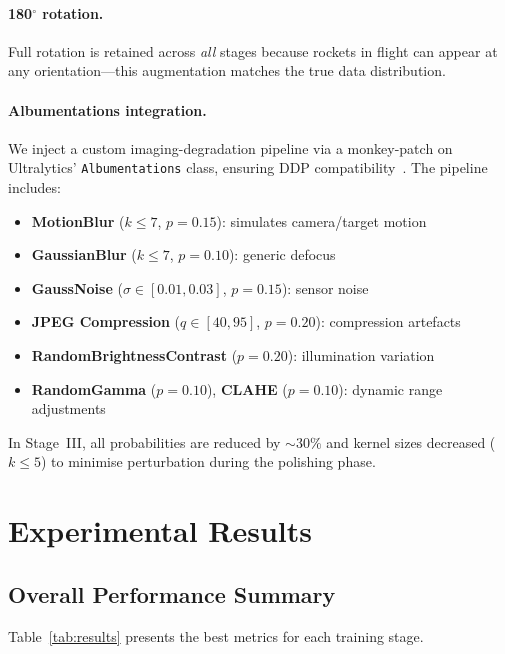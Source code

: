 \documentclass[12pt, titlepage]{article}
\begin{document}
\paragraph{180$^{\circ}$ rotation.}  Full rotation is retained across
\emph{all} stages because rockets in flight can appear at any
orientation---this augmentation matches the true data distribution.

\paragraph{Albumentations integration.}
We inject a custom imaging-degradation pipeline via a monkey-patch on
Ultralytics' \texttt{Albumentations} class, ensuring DDP
compatibility~\citep{buslaev2020albumentations}. The pipeline includes:

\begin{itemize}[leftmargin=*, itemsep=1pt]
  \item \textbf{MotionBlur} ($k{\leq}7$, $p{=}0.15$): simulates
        camera/target motion
  \item \textbf{GaussianBlur} ($k{\leq}7$, $p{=}0.10$): generic
        defocus
  \item \textbf{GaussNoise} ($\sigma \in [0.01, 0.03]$, $p{=}0.15$):
        sensor noise
  \item \textbf{JPEG Compression} ($q \in [40, 95]$, $p{=}0.20$):
        compression artefacts
  \item \textbf{RandomBrightnessContrast} ($p{=}0.20$): illumination
        variation
  \item \textbf{RandomGamma} ($p{=}0.10$), \textbf{CLAHE}
        ($p{=}0.10$): dynamic range adjustments
\end{itemize}

In Stage~III, all probabilities are reduced by ${\sim}30\%$ and kernel sizes
decreased ($k{\leq}5$) to minimise perturbation during the polishing phase.

\section{Experimental Results}
\label{sec:results}

\subsection{Overall Performance Summary}

Table~\ref{tab:results} presents the best metrics for each training stage.
\end{document}
